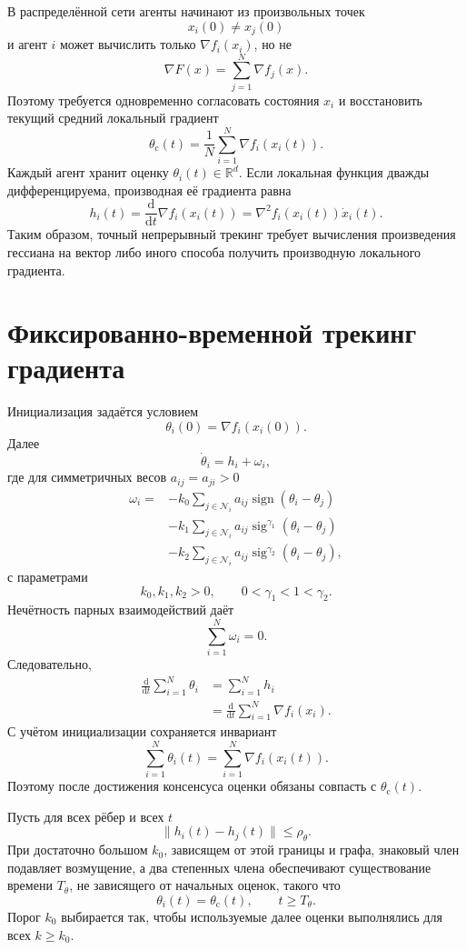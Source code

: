 В распределённой сети агенты начинают из произвольных точек
\[
    x_i(0)\ne x_j(0)
\]
и агент \(i\) может вычислить только \(\nabla f_i(x_i)\), но не
\[
    \nabla F(x)=\sum_{j=1}^{N}\nabla f_j(x).
\]
Поэтому требуется одновременно согласовать состояния \(x_i\) и
восстановить текущий средний локальный градиент
\[
    \theta_{\mathrm c}(t)
    =
    \frac1N
    \sum_{i=1}^{N}\nabla f_i(x_i(t)).
\]
Каждый агент хранит оценку \(\theta_i(t)\in\mathbb R^d\). Если
локальная функция дважды дифференцируема, производная её градиента
равна
\[
    h_i(t)
    =
    \frac{\mathrm d}{\mathrm dt}\nabla f_i(x_i(t))
    =
    \nabla^2f_i(x_i(t))\dot x_i(t).
\]
Таким образом, точный непрерывный трекинг требует вычисления
произведения гессиана на вектор либо иного способа получить
производную локального градиента.

\section{Фиксированно-временной трекинг градиента}

Инициализация задаётся условием
\[
    \theta_i(0)=\nabla f_i(x_i(0)).
\]
Далее
\[
    \dot\theta_i=h_i+\omega_i,
\]
где для симметричных весов \(a_{ij}=a_{ji}>0\)
\[
\begin{aligned}
    \omega_i
    ={}&
    -k_0\sum_{j\in\mathcal N_i}
    a_{ij}\operatorname{sign}(\theta_i-\theta_j)
    \\
    &-
    k_1\sum_{j\in\mathcal N_i}
    a_{ij}\operatorname{sig}^{\gamma_1}(\theta_i-\theta_j)
    \\
    &-
    k_2\sum_{j\in\mathcal N_i}
    a_{ij}\operatorname{sig}^{\gamma_2}(\theta_i-\theta_j),
\end{aligned}
\]
с параметрами
\[
    k_0,k_1,k_2>0,
    \qquad
    0<\gamma_1<1<\gamma_2.
\]
Нечётность парных взаимодействий даёт
\[
    \sum_{i=1}^{N}\omega_i=0.
\]
Следовательно,
\[
\begin{aligned}
    \frac{\mathrm d}{\mathrm dt}
    \sum_{i=1}^{N}\theta_i
    &=
    \sum_{i=1}^{N}h_i
    \\
    &=
    \frac{\mathrm d}{\mathrm dt}
    \sum_{i=1}^{N}\nabla f_i(x_i).
\end{aligned}
\]
С учётом инициализации сохраняется инвариант
\[
    \sum_{i=1}^{N}\theta_i(t)
    =
    \sum_{i=1}^{N}\nabla f_i(x_i(t)).
\]
Поэтому после достижения консенсуса оценки обязаны совпасть с
\(\theta_{\mathrm c}(t)\).

Пусть для всех рёбер и всех \(t\)
\[
    \lVert h_i(t)-h_j(t)\rVert
    \le
    \rho_\theta.
\]
При достаточно большом \(k_0\), зависящем от этой границы и графа,
знаковый член подавляет возмущение, а два степенных члена обеспечивают
существование времени \(T_\theta\), не зависящего от начальных
оценок, такого что
\[
    \theta_i(t)=\theta_{\mathrm c}(t),
    \qquad
    t\ge T_\theta.
\]
Порог \(k_0\) выбирается так, чтобы используемые далее оценки выполнялись для всех \(k\ge k_0\).

